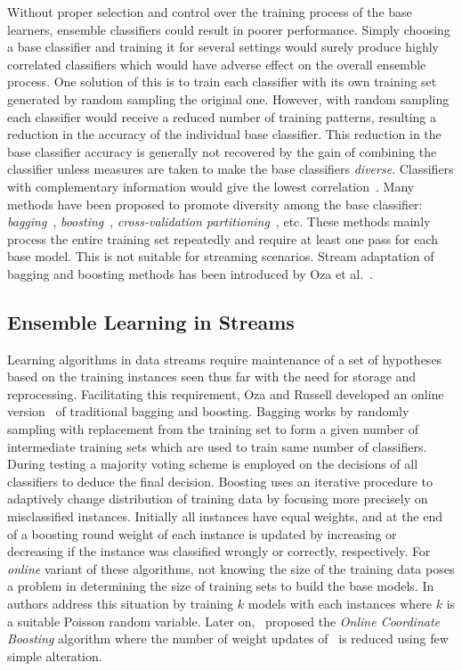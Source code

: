 Without proper selection and control over the training process of the base learners, ensemble classifiers could result in poorer performance. Simply choosing a base classifier and training it for several settings would surely produce highly correlated classifiers which would have adverse effect on the overall ensemble process. One solution of this  is to train each classifier with its own training set generated by random sampling the original one. However, with random sampling each classifier would receive a reduced number of training patterns, resulting a reduction in the accuracy of the individual base classifier. This reduction in the base classifier accuracy is generally not recovered by the gain of combining the classifier unless measures are taken to make the base classifiers \textit{diverse}. Classifiers with complementary information would give the lowest correlation~\cite{breiman93:regression, tumer99:whyens}. Many methods have been proposed to promote diversity among the base classifier: \textit{bagging}~\cite{breiman94:bagging}, \textit{boosting}~\cite{drucker94:boosting, freund97:boosting, oza99:whyens}, \textit{cross-validation partitioning}~\cite{krogh95:ensNNcv, tumer99:whyens}, etc. These methods mainly process the entire training set repeatedly and require at least one pass for each base model. This is not suitable for streaming scenarios. Stream adaptation of bagging and boosting methods has been introduced by Oza et al.~\cite{oza01:obagboost,oza01:thesis}.

\subsection{Ensemble Learning in Streams}
Learning algorithms in data streams require maintenance of a set of hypotheses based on the training instances seen thus far with the need for storage and reprocessing. Facilitating this requirement, Oza and Russell developed an online version~\cite{oza01:obagboost, oza01:thesis} of traditional bagging and boosting. Bagging works by randomly sampling with replacement from the training set to form a given number of intermediate training sets which are used to train same number of classifiers. During testing a majority voting scheme is employed on the decisions of all classifiers to deduce the final decision. Boosting uses an iterative procedure to adaptively change distribution of training data by focusing more precisely on misclassified instances. Initially all instances have equal weights, and at the end of a boosting round weight of each instance is updated by increasing or decreasing if the instance was classified wrongly or correctly, respectively. For \textit{online} variant of these algorithms, not knowing the size of the training data poses a problem in determining the size of training sets to build the base models. In~\cite{oza01:obagboost} authors address this situation by training $k$ models with each instances where $k$ is a suitable Poisson random variable. Later on,~\cite{pelossof08:boosting} proposed the \textit{Online Coordinate Boosting} algorithm where the number of weight updates of~\cite{oza01:obagboost} is reduced using few simple alteration.


